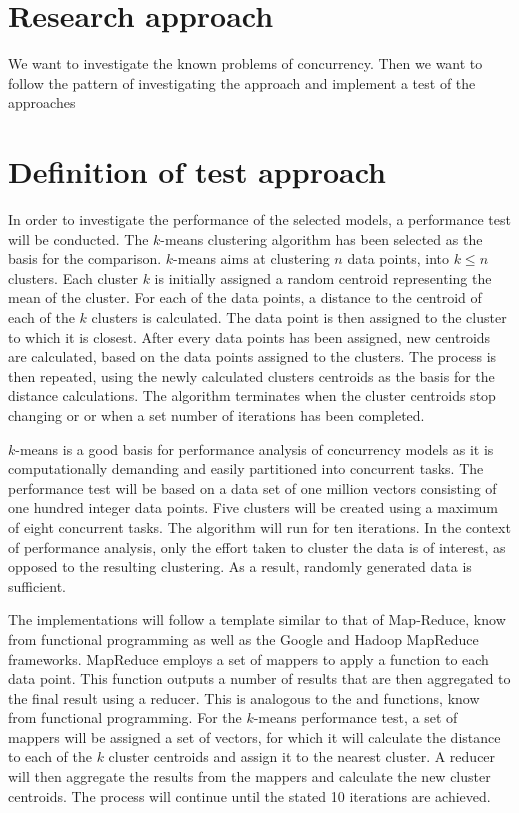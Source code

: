 \makeatletter {}\makeatother
{}
\section{Research approach}
We want to investigate the known problems of concurrency. Then we want to follow the pattern of investigating the approach and implement a test of the approaches

\section{Definition of test approach}
In order to investigate the performance of the selected models, a performance test will be conducted. The $k$-means clustering algorithm has been selected as the basis for the comparison. $k$-means aims at clustering $n$ data points, into $k \leq n$ clusters\cite[p. 451]{dataminingconceptsandtechniques}\cite[p. 128]{epstein2011towards}. Each cluster $k$ is initially assigned a random centroid representing the mean of the cluster. For each of the data points, a distance to the centroid of each of the $k$ clusters is calculated. The data point is then assigned to the cluster to which it is closest. After every data points has been assigned, new centroids are calculated, based on the data points assigned to the clusters. The process is then repeated, using the newly calculated clusters centroids as the basis for the distance calculations. The algorithm terminates when the cluster centroids stop changing or or when a set number of iterations has been completed\cite[p. 128]{epstein2011towards}.

$k$-means is a good basis for performance analysis of concurrency models as it is computationally demanding and easily partitioned into concurrent tasks\cite[p. 128]{epstein2011towards}. The performance test will be based on a data set of one million vectors consisting of one hundred integer data points. Five clusters will be created using a maximum of eight concurrent tasks. The algorithm will run for ten iterations. In the context of performance analysis, only the effort taken to cluster the data is of interest, as opposed to the resulting clustering. As a result, randomly generated data is sufficient.

The implementations will follow a template similar to that of Map-Reduce\cite{dean2008mapreduce}, know from functional programming as well as the Google and Hadoop MapReduce frameworks. MapReduce employs a set of mappers to apply a function to each data point. This function outputs a number of results that are then aggregated to the final result using a reducer. This is analogous to the  and  functions, know from functional programming. For the $k$-means performance test, a set of mappers will be assigned a set of vectors, for which it will calculate the distance to each of the $k$ cluster centroids and assign it to the nearest cluster. A reducer will then aggregate the results from the mappers and calculate the new cluster centroids. The process will continue until the stated 10 iterations are achieved.

